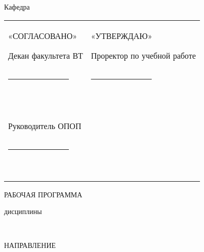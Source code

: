 

\thispagestyle{empty}%
\begin{center}%
\MakeUppercase{\Ministry}
\end{center}%
%
\begin{center}%
\OrganizationNameFirst
\par
\OrganizationNameSecond
\end{center}%

\begin{center}%
Кафедра ~\AuthorDepartment
\end{center}%

%
\vspace{0pt plus4fill} 
%
\begin{tabularx}{\textwidth}{p{}p{}}
	«СОГЛАСОВАНО»\par
	Декан факультета ВТ\par
	\underline{~~~~~~~~~~~~~~~} \SignedDecan~\par
	\SignedDate~\par & 
	«УТВЕРЖДАЮ»\par
	Проректор по учебной работе\par
	\underline{~~~~~~~~~~~~~~~} \SignedStudyHead~\par
	\SignedDate~\\
	Руководитель ОПОП\par
	\underline{~~~~~~~~~~~~~~~} \SignedOPOPHead~\par
	\SignedDate~\par &~\\   	
\end{tabularx}

\vspace{0pt plus6fill} 
\begin{center}%
{\large РАБОЧАЯ ПРОГРАММА}\par
дисциплины \par
\textbf{\DisciplineCode}~\MakeUppercase{\DisciplineName}
\end{center}%

\vspace{0pt plus6fill} 
\begin{center}%
{\large НАПРАВЛЕНИЕ}\par
\textbf{\SpecialityCode}~\MakeUppercase{\SpecialityName}
\end{center}%


